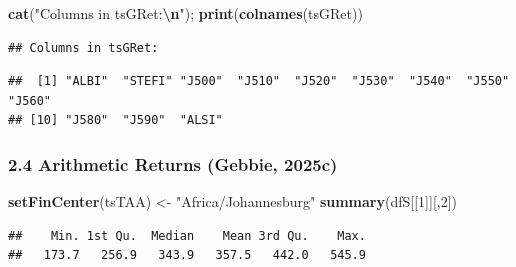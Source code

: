 \documentclass[
  12pt,
]{article}
\newenvironment{Shaded}{\begin{snugshade}}{\end{snugshade}}
\newcommand{\DecValTok}[1]{\textcolor[rgb]{0.00,0.00,0.81}{#1}}
\newcommand{\FunctionTok}[1]{\textcolor[rgb]{0.13,0.29,0.53}{\textbf{#1}}}
\newcommand{\NormalTok}[1]{#1}
\newcommand{\OtherTok}[1]{\textcolor[rgb]{0.56,0.35,0.01}{#1}}
\newcommand{\SpecialCharTok}[1]{\textcolor[rgb]{0.81,0.36,0.00}{\textbf{#1}}}
\newcommand{\StringTok}[1]{\textcolor[rgb]{0.31,0.60,0.02}{#1}}
\begin{document}
\begin{Shaded}
\begin{Highlighting}[]
\FunctionTok{cat}\NormalTok{(}\StringTok{"Columns in tsGRet:}\SpecialCharTok{\textbackslash{}n}\StringTok{"}\NormalTok{); }\FunctionTok{print}\NormalTok{(}\FunctionTok{colnames}\NormalTok{(tsGRet))}
\end{Highlighting}
\end{Shaded}

\begin{verbatim}
## Columns in tsGRet:
\end{verbatim}

\begin{verbatim}
##  [1] "ALBI"  "STEFI" "J500"  "J510"  "J520"  "J530"  "J540"  "J550"  "J560" 
## [10] "J580"  "J590"  "ALSI"
\end{verbatim}

\subsubsection{2.4 Arithmetic Returns (Gebbie,
2025c)}\label{arithmetic-returns-tim_btmlx-1}

\begin{Shaded}
\begin{Highlighting}[]
\FunctionTok{setFinCenter}\NormalTok{(tsTAA) }\OtherTok{\textless{}{-}} \StringTok{"Africa/Johannesburg"}
\FunctionTok{summary}\NormalTok{(dfS[[}\DecValTok{1}\NormalTok{]][,}\DecValTok{2}\NormalTok{])}
\end{Highlighting}
\end{Shaded}

\begin{verbatim}
##    Min. 1st Qu.  Median    Mean 3rd Qu.    Max. 
##   173.7   256.9   343.9   357.5   442.0   545.9
\end{verbatim}
\end{document}
